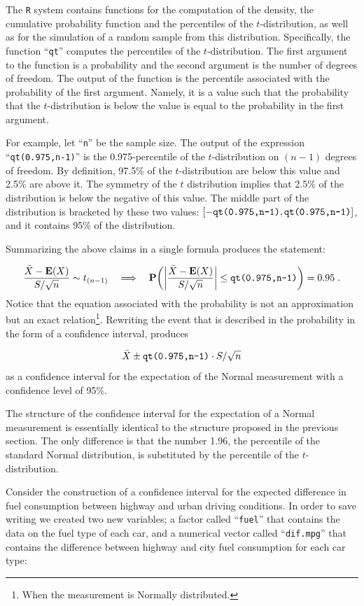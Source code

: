\documentclass[
]{krantz}
\newcommand{\Expec}{\mathbf{E}}
\newcommand{\Prob}{\mathbf{P}}
\theoremstyle{definition}
\theoremstyle{definition}
\theoremstyle{definition}
\theoremstyle{remark}
\begin{document}
The \texttt{R} system contains functions for the computation of the density,
the cumulative probability function and the percentiles of the
\(t\)-distribution, as well as for the simulation of a random sample from
this distribution. Specifically, the function ``\texttt{qt}'' computes the
percentiles of the \(t\)-distribution. The first argument to the function
is a probability and the second argument is the number of degrees of
freedom. The output of the function is the percentile associated with
the probability of the first argument. Namely, it is a value such that
the probability that the \(t\)-distribution is below the value is equal to
the probability in the first argument.

For example, let ``\texttt{n}'' be the sample size. The output of the expression
``\texttt{qt(0.975,n-1)}'' is the 0.975-percentile of the \(t\)-distribution on
\((n-1)\) degrees of freedom. By definition, 97.5\% of the \(t\)-distribution
are below this value and 2.5\% are above it. The symmetry of the \(t\)
distribution implies that 2.5\% of the distribution is below the negative
of this value. The middle part of the distribution is bracketed by these
two values:
\([-\mbox{\texttt{qt(0.975,n-1)}}, \mbox{\texttt{qt(0.975,n-1)}}]\), and
it contains 95\% of the distribution.

Summarizing the above claims in a single formula produces the statement:

\[\frac{\bar X - \Expec(X)}{S/\sqrt{n}} \sim t_{(n-1)} \quad \Longrightarrow \quad \Prob \bigg(\bigg|\frac{\bar X - \Expec(X)}{S/\sqrt{n}}\bigg| \leq \mbox{\texttt{qt(0.975,n-1)}} \bigg) = 0.95\;.\]
Notice that the equation associated with the probability is not an
approximation but an exact relation\footnote{When the measurement is Normally distributed.}. Rewriting the event that is
described in the probability in the form of a confidence interval,
produces

\[\bar X \pm \mbox{\texttt{qt(0.975,n-1)}}\cdot S/ \sqrt{n}\]
as a confidence interval for the expectation of the Normal measurement
with a confidence level of 95\%.

The structure of the confidence interval for the expectation of a Normal
measurement is essentially identical to the structure proposed in the
previous section. The only difference is that the number 1.96, the
percentile of the standard Normal distribution, is substituted by the
percentile of the \(t\)-distribution.

Consider the construction of a confidence interval for the expected
difference in fuel consumption between highway and urban driving
conditions. In order to save writing we created two new variables; a
factor called ``\texttt{fuel}'' that contains the data on the fuel type of each
car, and a numerical vector called ``\texttt{dif.mpg}'' that contains the
difference between highway and city fuel consumption for each car type:
\end{document}
